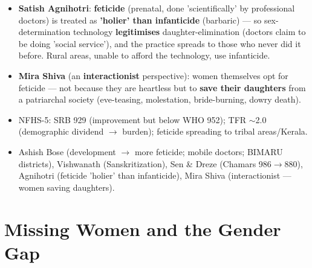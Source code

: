 \begin{KeyConcept}
\begin{itemize}
\item \textbf{Satish Agnihotri}: \textbf{feticide} (prenatal, done 'scientifically' by professional doctors) is treated as \textbf{'holier' than infanticide} (barbaric) --- so sex-determination technology \textbf{legitimises} daughter-elimination (doctors claim to be doing 'social service'), and the practice spreads to those who never did it before. Rural areas, unable to afford the technology, use infanticide.
\item \textbf{Mira Shiva} (an \textbf{interactionist} perspective): women themselves opt for feticide --- not because they are heartless but to \textbf{save their daughters} from a patriarchal society (eve-teasing, molestation, bride-burning, dowry death).
\end{itemize}
\end{KeyConcept}

\begin{QuickRevision}
\begin{itemize}
\item NFHS-5: SRB 929 (improvement but below WHO 952); TFR $\sim$2.0 (demographic dividend $\rightarrow$ burden); feticide spreading to tribal areas/Kerala.
\item Ashish Bose (development $\rightarrow$ more feticide; mobile doctors; BIMARU districts), Vishwanath (Sanskritization), Sen \& Dreze (Chamars 986$\rightarrow$880), Agnihotri (feticide 'holier' than infanticide), Mira Shiva (interactionist --- women saving daughters).
\end{itemize}
\end{QuickRevision}

\section{Missing Women and the Gender Gap}

